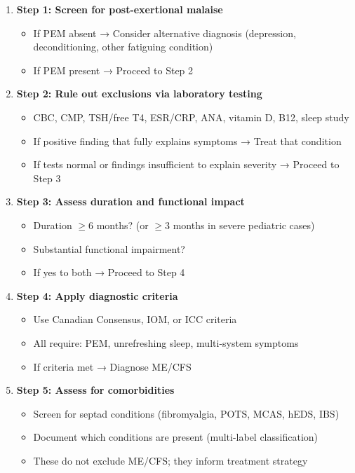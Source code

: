 \begin{observation}
\label{obs:diagnostic-algorithm}

\begin{enumerate}
    \item \textbf{Step 1: Screen for post-exertional malaise}
    \begin{itemize}
        \item If PEM absent → Consider alternative diagnosis (depression, deconditioning, other fatiguing condition)
        \item If PEM present → Proceed to Step 2
    \end{itemize}

    \item \textbf{Step 2: Rule out exclusions via laboratory testing}
    \begin{itemize}
        \item CBC, CMP, TSH/free T4, ESR/CRP, ANA, vitamin D, B12, sleep study
        \item If positive finding that fully explains symptoms → Treat that condition
        \item If tests normal or findings insufficient to explain severity → Proceed to Step 3
    \end{itemize}

    \item \textbf{Step 3: Assess duration and functional impact}
    \begin{itemize}
        \item Duration $\geq 6$ months? (or $\geq 3$ months in severe pediatric cases)
        \item Substantial functional impairment?
        \item If yes to both → Proceed to Step 4
    \end{itemize}

    \item \textbf{Step 4: Apply diagnostic criteria}
    \begin{itemize}
        \item Use Canadian Consensus, IOM, or ICC criteria
        \item All require: PEM, unrefreshing sleep, multi-system symptoms
        \item If criteria met → Diagnose ME/CFS
    \end{itemize}

    \item \textbf{Step 5: Assess for comorbidities}
    \begin{itemize}
        \item Screen for septad conditions (fibromyalgia, POTS, MCAS, hEDS, IBS)
        \item Document which conditions are present (multi-label classification)
        \item These do not exclude ME/CFS; they inform treatment strategy
    \end{itemize}


\end{enumerate}
\end{observation}
